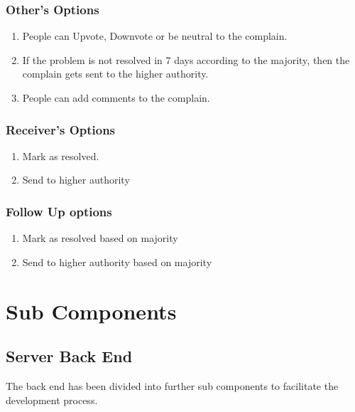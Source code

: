 \documentclass{article}
\begin{document}
			\subsubsection{Other's Options}
				\begin{enumerate}
					\item People can Upvote, Downvote or be neutral to the complain.
					\item If the problem is not resolved in 7 days according to the majority, then the complain gets sent to the higher authority.
					\item People can add comments to the complain.
				\end{enumerate}
			\subsubsection{Receiver's Options}
				\begin{enumerate}
					\item Mark as resolved.
					\item Send to higher authority
				\end{enumerate}
			\subsubsection{Follow Up options}
				\begin{enumerate}
					\item Mark as resolved based on majority
					\item Send to higher authority based on majority
				\end{enumerate}
	\section{Sub Components}
			\subsection{Server Back End}
				The back end has been divided into further sub components to facilitate the development process.
\end{document}
